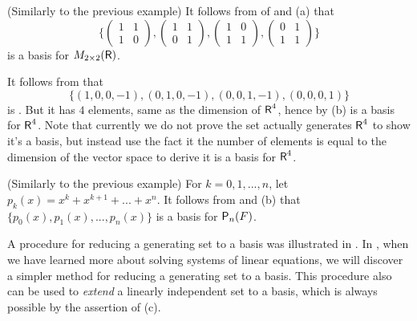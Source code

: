 \begin{example} \label{example 1.6.15}
(Similarly to the previous example) It follows from  of and (a) that
\[
\bigg\{
    \begin{pmatrix}
      1 & 1 \\
      1 & 0
    \end{pmatrix},
    \begin{pmatrix}
      1 & 1 \\
      0 & 1
    \end{pmatrix},
    \begin{pmatrix}
      1 & 0 \\
      1 & 1
    \end{pmatrix},
    \begin{pmatrix}
      0 & 1 \\
      1 & 1
    \end{pmatrix}
\bigg\}
\]
is a basis for \(M_{2 \times 2}(\textsf{R})\).
\end{example}

\begin{example} \label{example 1.6.16}
It follows from  that
\[
    \{ (1, 0, 0, -1), (0, 1, 0, -1), (0, 0, 1, -1), (0, 0, 0, 1) \}
\]
is \LID{}.
But it has \(4\) elements, same as the dimension of \(\textsf{R}^4\), hence by (b) is a basis for \(\textsf{R}^4\).
Note that currently we do not prove the set actually generates \(\textsf{R}^4\) to show it's a basis, but instead use the fact it the number of elements is equal to the dimension of the vector space to derive it is a basis for \(\textsf{R}^4\).
\end{example}

\begin{example} \label{example 1.6.17}
(Similarly to the previous example) For \(k = 0, 1, ..., n\), let \(p_k(x) = x^k + x^{k + 1} + ... + x^n\).
It follows from  and (b) that
\(
    \{ p_0(x), p_1(x), ..., p_n(x) \}
\)
is a basis for \(\textsf{P}_n(F)\).
\end{example}

\begin{remark} \label{remark 1.6.5}
A procedure for reducing a generating set to a basis was illustrated in .
\TODOREF{} In , when we have learned more about solving systems of linear equations, we will discover a simpler method for reducing a generating set to a basis.
This procedure also can be used to \emph{extend} a linearly
independent set to a basis, which is always possible by the assertion of (c).
\end{remark}

